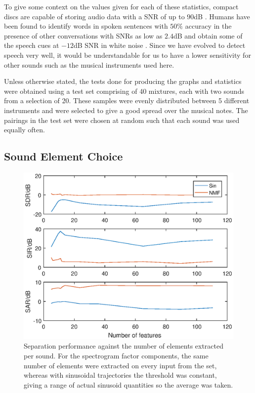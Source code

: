 \documentclass[12pt,a4paper,twoside,openright]{report}
\begin{document}
To give some context on the values given for each of these statistics, compact discs are capable of storing audio data with a SNR of up to $ 90 $dB \cite{fries2005digital}. Humans have been found to identify words in spoken sentences with $ 50\% $ accuracy in the presence of other conversations with SNRs as low as $ 2.4 $dB \cite{killion2004development} and obtain some of the speech cues at $ -12 $dB SNR in white noise \cite{miller1955analysis}. Since we have evolved to detect speech very well, it would be understandable for us to have a lower sensitivity for other sounds such as the musical instruments used here.

Unless otherwise stated, the tests done for producing the graphs and statistics were obtained using a test set comprising of 40 mixtures, each with two sounds from a selection of 20. These samples were evenly distributed between 5 different instruments and were selected to give a good spread over the musical notes. The pairings in the test set were chosen at random such that each sound was used equally often.

\subsection{Sound Element Choice}


\begin{figure}
\centering
\includegraphics[width=0.7\linewidth]{./FeatureCompPlot}
\caption[Separation performance against the number of elements extracted per sound.]{Separation performance against the number of elements extracted per sound. For the spectrogram factor components, the same number of elements were extracted on every input from the set, whereas with sinusoidal trajectories the threshold was constant, giving a range of actual sinusoid quantities so the average was taken.}
\label{fig:FeatureCompPlot}
\end{figure}
\end{document}
